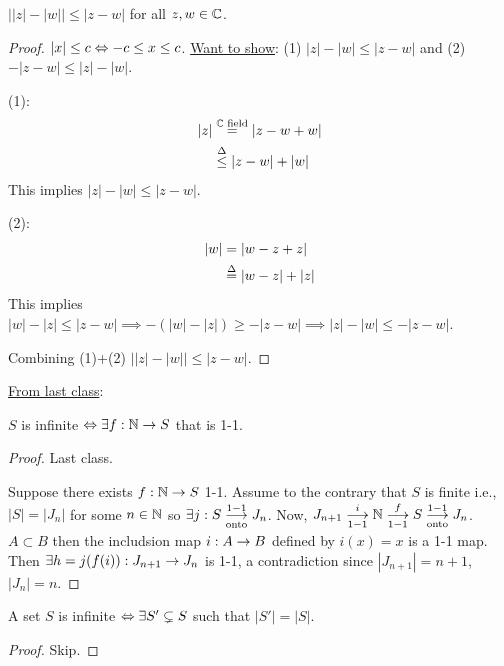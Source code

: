 \documentclass[]{article}
\begin{document}
\begin{example}
	[HW3.4] $\left| |z|-|w|\right| \leq |z-w|$ for all $z,w\in\mathbb{C}$.
	\begin{proof}
		$|x|\leq c \Leftrightarrow -c\leq x \leq c$.
		\ul{Want to show}: (1) $|z|-|w| \leq |z-w|$ and (2) $-|z-w|\leq |z|-|w|$.

		(1): 
		\begin{align*}
			|z| &\overset{\mathbb{C}\text{ field}}{=} |z-w+w| \\
				&\overset{\Delta}{\leq} |z-w| + |w|		
		\end{align*}
		This implies $|z|-|w|\leq |z-w|$.

		(2):
		\begin{align*}
			|w| &= |w-z+z| \\
				&\overset{\Delta}{=} |w-z|+|z|
		\end{align*}
		This implies $|w|-|z|\leq |z-w| \implies -(|w|-|z|) \geq -|z-w| \implies |z|-|w| \leq -|z-w|$.
		
		Combining (1)+(2) $\left||z|-|w|\right| \leq |z-w|$.
	\end{proof}
\end{example}

\ul{From last class}:
\begin{proposition}
	$S$ is infinite $\Leftrightarrow \exists f:\mathbb{N} \rightarrow S$ that is 1-1.
\end{proposition}
\begin{proof}
	\say{$\implies$} Last class.

	\say{$\Lla$} Suppose there exists $f:\mathbb{N} \rightarrow S$ 1-1.
	Assume to the contrary that $S$ is finite i.e., $|S| = |J_n|$ for some $n\in\mathbb{N}$ so $\exists j:S\overset{1-1}{\underset{\text{onto}}{\longrightarrow}} J_n$.
	Now, $J_{n+1} \overset{i}{\underset{1-1}{\longrightarrow}} \mathbb{N} \overset{f}{\underset{1-1}{\longrightarrow}} S \overset{1-1}{\underset{\text{onto}}{\longrightarrow}} J_n$.
	$A\subset B$ then the includsion map $i:A\rightarrow B$ defined by $i(x) = x$ is a 1-1 map.
	Then $\exists h = j(f(i)): J_{n+1} \rightarrow J_n$ is 1-1, a contradiction since $|J_{n+1}| = n+1$, $|J_n| = n$.
\end{proof}
\begin{proposition}
	A set $S$ is infinite $\Leftrightarrow \exists S'\subsetneq S$ such that $|S'| = |S|$.
\end{proposition}
\begin{proof}
	Skip.
\end{proof}
\end{document}

